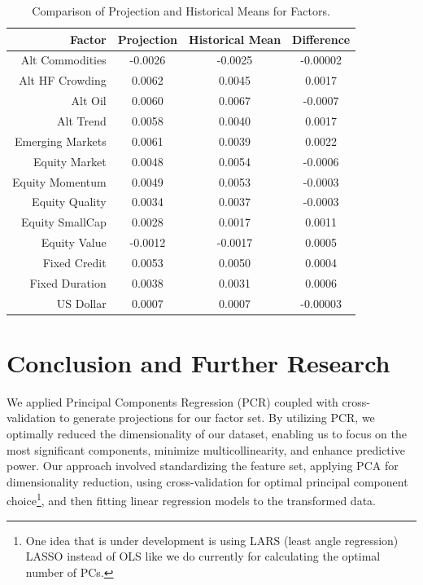 \documentclass{ledger}
\begin{document}
\begin{table}[ht]
\centering
\caption{Comparison of Projection and Historical Means for Factors. \label{table:projection_vs_actual}}
	\begin{tabularx}{300pt}{rccc}
	\toprule
		\textbf{Factor} & \textbf{Projection} & \textbf{Historical Mean} & \textbf{Difference} \\
	\midrule
		Alt Commodities & -0.0026 & -0.0025 & -0.00002 \\
		Alt HF Crowding & 0.0062 & 0.0045 & 0.0017 \\
		Alt Oil & 0.0060 & 0.0067 & -0.0007 \\
		Alt Trend & 0.0058 & 0.0040 & 0.0017 \\
		Emerging Markets & 0.0061 & 0.0039 & 0.0022 \\
		Equity Market & 0.0048 & 0.0054 & -0.0006 \\
		Equity Momentum & 0.0049 & 0.0053 & -0.0003 \\
		Equity Quality & 0.0034 & 0.0037 & -0.0003 \\
		Equity SmallCap & 0.0028 & 0.0017 & 0.0011 \\
		Equity Value & -0.0012 & -0.0017 & 0.0005 \\
		Fixed Credit & 0.0053 & 0.0050 & 0.0004 \\
		Fixed Duration & 0.0038 & 0.0031 & 0.0006 \\
		US Dollar & 0.0007 & 0.0007 & -0.00003 \\
	\bottomrule
	\end{tabularx}
\end{table}

\section{Conclusion and Further Research}
We applied Principal Components Regression (PCR) coupled with cross-validation to generate projections for our factor set. By utilizing PCR, we optimally reduced the dimensionality of our dataset, enabling us to focus on the most significant components, minimize multicollinearity, and enhance predictive power. Our approach involved standardizing the feature set, applying PCA for dimensionality reduction, using cross-validation for optimal principal component choice\footnote{One idea that is under development is using LARS (least angle regression) LASSO instead of OLS like we do currently for calculating the optimal number of PCs.}, and then fitting linear regression models to the transformed data. \\
\end{document}
